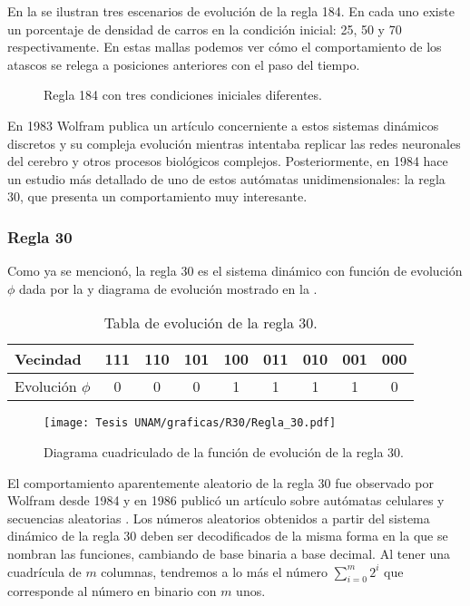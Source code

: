 \documentclass[../Main.tex]{subfiles}
\begin{document}
En la  se ilustran tres escenarios de evolución de la regla 184. En cada uno existe un porcentaje de densidad de carros en la condición inicial: 25, 50 y 70 respectivamente. En estas mallas podemos ver cómo el comportamiento de los atascos se relega a posiciones anteriores con el paso del tiempo. 

\begin{figure}[h!]
\centering
{}
\vfill
{}
\vfill
{}
\vfill
\caption{Regla 184 con tres condiciones iniciales diferentes.}
\label{fig:128}
\end{figure}



 
 En 1983 Wolfram publica un artículo \cite{Wolfram1983} concerniente a estos sistemas dinámicos discretos y su compleja evolución mientras intentaba replicar las redes neuronales del cerebro y otros procesos biológicos complejos. Posteriormente, en 1984 hace un estudio más detallado \cite{Wolfram2002} de uno de estos autómatas unidimensionales: la regla 30, que presenta un comportamiento muy interesante.   


\subsubsection{Regla 30}
Como ya se mencionó, la regla 30 es el sistema dinámico con función de evolución $\phi$ dada por la  y diagrama de evolución mostrado en la .

\begin{table}[h]
\centering
\begin{tabular}{@{}l|c|c|c|c|c|c|c|c@{}}
\toprule
Vecindad        &111&110&101&100&011&010&001&000\\ \midrule
Evolución $\phi$ & 0& 0& 0& 1& 1& 1& 1& 0\\ \bottomrule
\end{tabular}
\caption{Tabla de evolución de la regla 30.}
\label{tab:r30}
\end{table}
\begin{figure}[h]
\texttt{[image: Tesis UNAM/graficas/R30/Regla\_30.pdf]}
\centering
\caption{Diagrama cuadriculado de la función de evolución de la regla 30.}
\label{fig:dr30}
\end{figure}
El comportamiento aparentemente aleatorio de la regla 30 fue observado por Wolfram desde 1984 y en 1986 publicó un artículo sobre autómatas celulares y secuencias aleatorias \cite{wolfram1986}. Los números aleatorios obtenidos a partir del sistema dinámico de la regla 30 deben ser decodificados de la misma forma en la que se nombran las funciones, cambiando de base binaria a base decimal. Al tener una cuadrícula de $m$ columnas, tendremos a lo más el número \(\sum_{i=0}^m2^i\) que corresponde al número en binario con $m$ unos.
\end{document}
